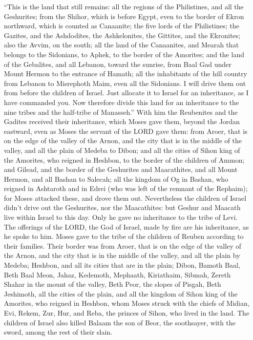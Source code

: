 \myverse{}“This is the land that still remains: all the regions of the Philistines,
and all the Geshurites;
\myverse{}from the Shihor, which is before Egypt, even to the border of Ekron northward,
which is counted as Canaanite; the five lords of the Philistines; the Gazites, and the Ashdodites, the
Ashkelonites, the Gittites, and the Ekronites; also the Avvim,
\myverse{}on the south; all the land of the Canaanites, and Mearah that belongs to the
Sidonians, to Aphek, to the border of the Amorites;
\myverse{}and the land of the Gebalites, and all Lebanon, toward the sunrise, from Baal
Gad under Mount Hermon to the entrance of Hamath;
\myverse{}all the inhabitants of the hill country from Lebanon to Misrephoth Maim, even
all the Sidonians. I will drive them out from before the children of Israel. Just allocate it to Israel
for an inheritance, as I have commanded you.
\myverse{}Now therefore divide this land for an inheritance to the nine tribes and the
half-tribe of Manasseh.”
\myverse{}With him the Reubenites and the Gadites received their inheritance, which Moses
gave them, beyond the Jordan eastward, even as Moses the servant of the LORD gave them:
\myverse{}from Aroer, that is on the edge of the valley of the Arnon, and the city that
is in the middle of the valley, and all the plain of Medeba to Dibon;
\myverse{}and all the cities of Sihon king of the Amorites, who reigned in Heshbon,
to the border of the children of Ammon;
\myverse{}and Gilead, and the border of the Geshurites and Maacathites, and all Mount
Hermon, and all Bashan to Salecah;
\myverse{}all the kingdom of Og in Bashan, who reigned in Ashtaroth and in Edrei (who
was left of the remnant of the Rephaim); for Moses attacked these, and drove them out.
\myverse{}Nevertheless the children of Israel didn’t drive out the Geshurites, nor
the Maacathites: but Geshur and Maacath live within Israel to this day.
\myverse{}Only he gave no inheritance to the tribe of Levi. The offerings of the LORD,
the God of Israel, made by fire are his inheritance, as he spoke to him.
\myverse{}Moses gave to the tribe of the children of Reuben according to their families.
\myverse{}Their border was from Aroer, that is on the edge of the valley of the Arnon,
and the city that is in the middle of the valley, and all the plain by Medeba;
\myverse{}Heshbon, and all its cities that are in the plain; Dibon, Bamoth Baal, Beth
Baal Meon,
\myverse{}Jahaz, Kedemoth, Mephaath,
\myverse{}Kiriathaim, Sibmah, Zereth Shahar in the mount of the valley,
\myverse{}Beth Peor, the slopes of Pisgah, Beth Jeshimoth,
\myverse{}all the cities of the plain, and all the kingdom of Sihon king of the Amorites,
who reigned in Heshbon, whom Moses struck with the chiefs of Midian, Evi, Rekem, Zur, Hur, and Reba, the
princes of Sihon, who lived in the land.
\myverse{}The children of Israel also killed Balaam the son of Beor, the soothsayer,
with the sword, among the rest of their slain.

